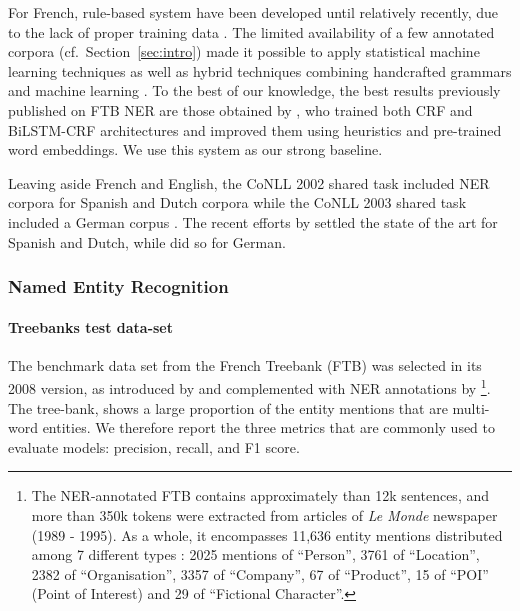 For French, rule-based system have been developed until relatively recently, due to the lack of proper training data \cite{sekine-nobata-2004-definition,rosset-etal-2005-interaction,stern-sagot-2010-resources,nouvel-etal-2014-pattern}. The limited availability of a few annotated corpora (cf.~Section~\ref{sec:intro}) made it possible to apply statistical machine learning techniques \cite{bechet-charton-2010-unsupervised,dupont-tellier-2014-named,dupont-2017-exploration} as well as hybrid techniques combining handcrafted grammars and machine learning \cite{bechet-etal-2011-cooperation}. To the best of our knowledge, the best results previously published on FTB NER are those obtained by , who trained both CRF and BiLSTM-CRF architectures and improved them using heuristics and pre-trained word embeddings. We use this system as our strong baseline.

Leaving aside French and English, the CoNLL 2002 shared task included NER corpora for Spanish and Dutch corpora \cite{tjong-kim-sang-2002-introduction} while the CoNLL 2003 shared task included a German corpus \cite{tjong-kim-sang-de-meulder-2003-introduction}. The recent efforts by  settled the state of the art for Spanish and Dutch, while  did so for German.


\subsubsection{Named Entity Recognition}\label{ner-section}
\label{evalner}

\paragraph{Treebanks test data-set}
The benchmark data set from the French Treebank (FTB)  \citep{abeille-etal-2003-building} was selected in its 2008 version, as introduced by \citet{candito-crabbe-2009-improving} and complemented with NER annotations by \citet{sagot-etal-2012-annotation}\footnote{The NER-annotated FTB contains approximately than 12k sentences, and more than 350k tokens were extracted from articles of \emph{Le Monde} newspaper (1989 - 1995). As a whole, it encompasses 11,636 entity mentions distributed among 7 different types : 2025 mentions of ``Person'', 3761 of ``Location'', 2382 of ``Organisation'', 3357 of ``Company'', 67 of ``Product'', 15 of ``POI'' (Point of Interest) and 29 of ``Fictional Character''.}.
The tree-bank, shows a large proportion of the entity mentions that are multi-word entities. We therefore report the three metrics that are commonly used to evaluate models: precision, recall, and F1 score.

